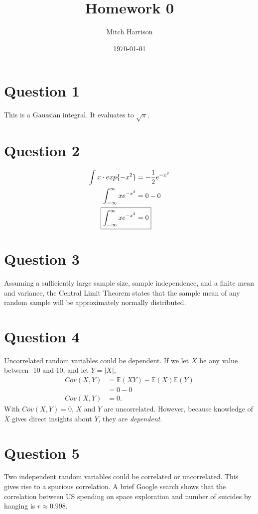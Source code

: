 \documentclass[titlepage, 12pt, leqno]{article}
\title{\Huge{Homework 0}}
\author{\large{Mitch Harrison}}
\date{\today}
\begin{document}
\setlength{\parskip}{1\baselineskip}
\setlength{\parindent}{15pt}
\maketitle
\newpage


\section*{Question 1}
This is a Gaussian integral. It evaluates to $\sqrt{\pi}$.

\section*{Question 2}
\begin{align*}
    \int x \cdot exp\{-x^{2}\} &= -\frac{1}{2}e^{-x^{2}} \\
    \int_{-\infty}^{\infty}xe^{-x^{2}} &= 0 - 0 \\
\Aboxed{\int_{-\infty}^{\infty}xe^{-x^{2}} &= 0}
\end{align*}

\section*{Question 3}
Assuming a sufficiently large sample size, sample independence, and a finite
mean and variance, the Central Limit Theorem states that the sample mean of
any random sample will be approximately normally distributed.

\section*{Question 4}
Uncorrelated random variables could be dependent. If we let $X$ be any value
between -10 and 10, and let $Y = |X|$, 
\begin{align*}
    Cov(X, Y) &= \mathbb{E}(XY) - \mathbb{E}(X)\mathbb{E}(Y) \\
              &= 0 - 0 \\
    Cov(X,Y) &= 0.
\end{align*}
With $Cov(X,Y) = 0$, $X$ and $Y$ are uncorrelated. However, because knowledge of
 $X$ gives direct insights about $Y$, they are \textit{dependent}.

\section*{Question 5}
Two independent random variables could be correlated or uncorrelated. This gives
rise to a spurious correlation. A brief Google search shows that the correlation
between US spending on space exploration and number of suicides by hanging is
 $r \approx 0.998$.
\end{document}
